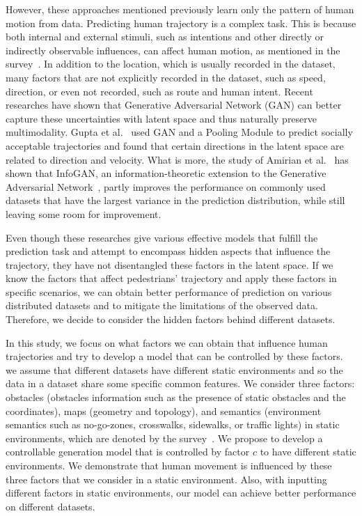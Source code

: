 However, these approaches mentioned previously learn only the pattern of human motion from data. Predicting human trajectory is a complex task. This is because both internal and external stimuli, such as intentions and other directly or indirectly observable influences, can affect human motion, as mentioned in the survey~\cite{humanmotionsurvey}. In addition to the location, which is usually recorded in the dataset, many factors that are not explicitly recorded in the dataset, such as speed, direction, or even not recorded, such as route and human intent. Recent researches have shown that Generative Adversarial Network (GAN) can better capture these uncertainties with latent space and thus naturally preserve multimodality. Gupta et al.~\cite{Gupta_2018_CVPR} used GAN and a Pooling Module to predict socially acceptable trajectories and found that certain directions in the latent space are related to direction and velocity. What is more, the study of Amirian et al.~\cite{Amirian_2019_CVPR_Workshops} has shown that InfoGAN, an information-theoretic extension to the Generative Adversarial Network~\cite{infogan}, partly improves the performance on commonly used datasets that have the largest variance in the prediction distribution, while still leaving some room for improvement.

Even though these researches give various effective models that fulfill the prediction task and attempt to encompass hidden aspects that influence the trajectory, they have not disentangled these factors in the latent space. If we know the factors that affect pedestrians' trajectory and apply these factors in specific scenarios, we can obtain better performance of prediction on various distributed datasets and to mitigate the limitations of the observed data. Therefore, we decide to consider the hidden factors behind different datasets.

In this study, we focus on what factors we can obtain that influence human trajectories and try to develop a model that can be controlled by these factors. we assume that different datasets have different static environments and so the data in a dataset share some specific common features. We consider three factors: obstacles (obstacles information such as the presence of static obstacles and the coordinates), maps (geometry and topology), and semantics (environment semantics such as no-go-zones, crosswalks, sidewalks, or traffic lights) in static environments, which are denoted by the survey~\cite{humanmotionsurvey}. We propose to develop a controllable generation model that is controlled by factor $c$ to have different static environments. We demonstrate that human movement is influenced by these three factors that we consider in a static environment. Also, with inputting different factors in static environments, our model can achieve better performance on different datasets.